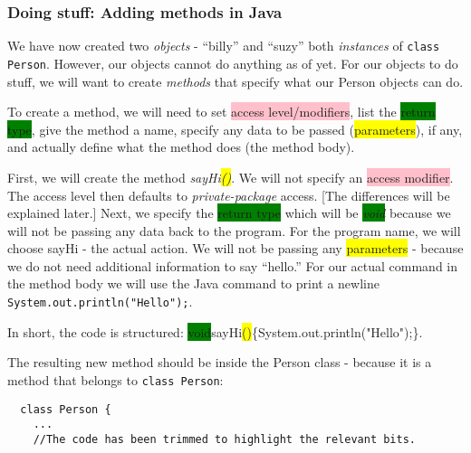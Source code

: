\documentclass{article}
\begin{document}
\begin{flushleft}
\subsubsection{Doing stuff: Adding methods in Java}
We have now created two \emph{objects} - ``billy'' and ``suzy'' both \emph{instances} of \texttt{class Person}. However, our objects cannot do anything as of yet. For our objects to do stuff, we will want to create \emph{methods} that specify what our Person objects can do.\par
To create a method, we will need to set \colorbox{pink}{access level/modifiers}, list the \colorbox{green}{return type}, give the method a \colorbox{babyblueeyes}{name}, specify any data to be passed (\colorbox{yellow}{parameters}), if any, and actually define what the method does (the \colorbox{bananamania}{method body}).\par
First, we will create the method \emph{ \colorbox{babyblueeyes}{sayHi}\colorbox{yellow}{()}}. We will not specify an \colorbox{pink}{access modifier}. The access level then defaults to \emph{private-package} access. [The differences will be explained later.] Next, we specify the \colorbox{green}{return type} which will be \emph{\colorbox{green}{void}} because we will not be passing any data back to the program. For the program name, we will choose \colorbox{babyblueeyes}{sayHi} - the actual action. We will not be passing any \colorbox{yellow}{parameters} - because we do not need additional information to say ``hello.'' For our actual command in the \colorbox{bananamania}{method body} we will use the Java command to print a newline  \colorbox{bananamania}{\texttt{System.out.println("Hello");}}.\par
\begin{tcolorbox}[enhanced,breakable, before upper={\let\clearpage\relax}, width=5in,center upper,
    fontupper=\bfseries,drop fuzzy shadow southeast,
    boxrule=0.4pt,sharp corners,colframe=gray!80!black,colback=gray!10]
  In short, the code is structured: \colorbox{green}{void}\colorbox{babyblueeyes}{sayHi}\colorbox{yellow}{()}\{\colorbox{bananamania}{System.out.println("Hello");}\}.
  \end{tcolorbox}
The resulting new method should be inside the Person class - because it is a method that belongs to \texttt{class Person}:

\label{code:sayhimethod}
\begin{verbatim}
  class Person {
    ...
    //The code has been trimmed to highlight the relevant bits.
    

\end{verbatim}
\end{flushleft}
\end{document}
